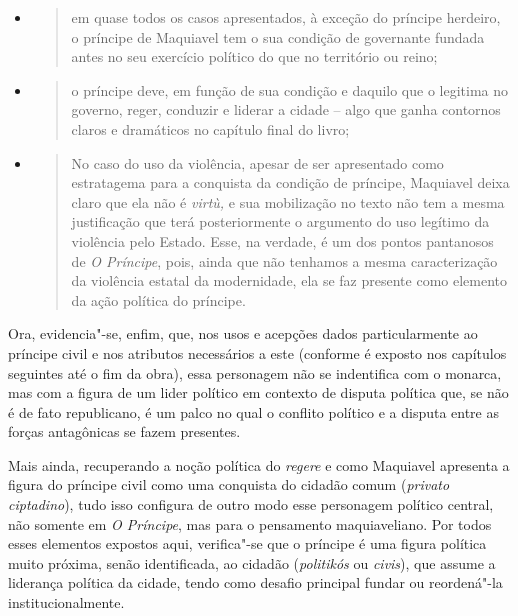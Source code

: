 \begin{itemize}
\item
  \begin{quote}
  em quase todos os casos apresentados, à exceção do príncipe herdeiro,
  o príncipe de Maquiavel tem o sua condição de governante fundada antes
  no seu exercício político do que no território ou reino;
  \end{quote}
\item
  \begin{quote}
  o príncipe deve, em função de sua condição e daquilo que o legitima no
  governo, reger, conduzir e liderar a cidade -- algo que ganha
  contornos claros e dramáticos no capítulo final do livro;
  \end{quote}
\item
  \begin{quote}
  No caso do uso da violência, apesar de ser apresentado como
  estratagema para a conquista da condição de príncipe, Maquiavel deixa
  claro que ela não é \emph{virtù,} e sua mobilização no texto não tem a
  mesma justificação que terá posteriormente o argumento do uso legítimo
  da violência pelo Estado. Esse, na verdade, é um dos pontos pantanosos
  de \emph{O Príncipe}, pois, ainda que não tenhamos a mesma
  caracterização da violência estatal da modernidade, ela se faz
  presente como elemento da ação política do príncipe.
  \end{quote}
\end{itemize}

Ora, evidencia"-se, enfim, que, nos usos e acepções dados particularmente
ao príncipe civil e nos atributos necessários a este (conforme é exposto
nos capítulos seguintes até o fim da obra), essa personagem não se
indentifica com o monarca, mas com a figura de um lider político em
contexto de disputa política que, se não é de fato republicano, é um
palco no qual o conflito político e a disputa entre as forças
antagônicas se fazem presentes.

Mais ainda, recuperando a noção política do \emph{regere} e como
Maquiavel apresenta a figura do príncipe civil como uma conquista do
cidadão comum (\emph{privato ciptadino}), tudo isso configura de outro
modo esse personagem político central, não somente em \emph{O Príncipe},
mas para o pensamento maquiaveliano. Por todos esses elementos expostos
aqui, verifica"-se que o príncipe é uma figura política muito próxima,
senão identificada, ao cidadão (\emph{politikós} ou \emph{civis}), que
assume a liderança política da cidade, tendo como desafio principal
fundar ou reordená"-la institucionalmente.

